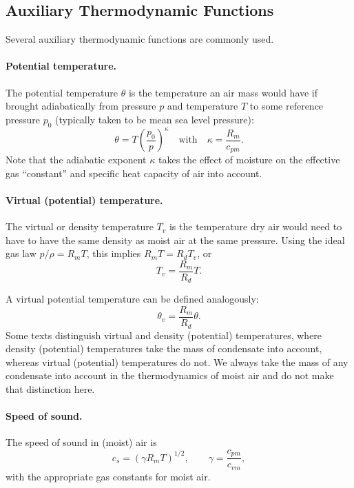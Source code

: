 \documentclass{article}
\begin{document}
\subsection{Auxiliary Thermodynamic Functions}

Several auxiliary thermodynamic functions are commonly used. 

\paragraph{Potential temperature.} The potential temperature $\theta$ is the temperature an air mass would have if brought adiabatically from pressure $p$ and temperature $T$ to some reference pressure $p_0$ (typically taken to be mean sea level pressure):
\begin{equation}\label{e:pot_temp_press_T}
\theta = T \left( \frac{p_0}{p} \right)^\kappa \quad \text{with} \quad \kappa = \frac{R_m}{c_{pm}}.
\end{equation}
Note that the adiabatic exponent $\kappa$ takes the effect of  moisture on the effective gas ``constant'' and specific heat capacity of air into account.

\paragraph{Virtual (potential) temperature.} The virtual or density temperature $T_v$ is the temperature dry air would need to have to have the same density as moist air at the same pressure. Using the ideal gas law $p/\rho = R_m T$, this implies $R_m T  = R_d T_v $, or
\begin{equation}\label{e:virtual_temp}
T_v = \frac{R_m}{R_d} T.
\end{equation}

A virtual potential temperature can be defined analogously:
\begin{equation}\label{e:virtual_pottemp}
\theta_v = \frac{R_m}{R_d} \theta.
\end{equation}
Some texts distinguish virtual and density (potential) temperatures, where density (potential) temperatures take the mass of condensate into account, whereas virtual (potential) temperatures do not. We always take the mass of any condensate into account in the thermodynamics of moist air and do not make that distinction here. 

\paragraph{Speed of sound.} The speed of sound in (moist) air is 
\begin{equation}\label{e:soundspeed}
 c_s = (\gamma R_m T)^{1/2}, \qquad \gamma = \frac{c_{pm}}{c_{vm}},
\end{equation}
with the appropriate gas constants for moist air.
\end{document}
